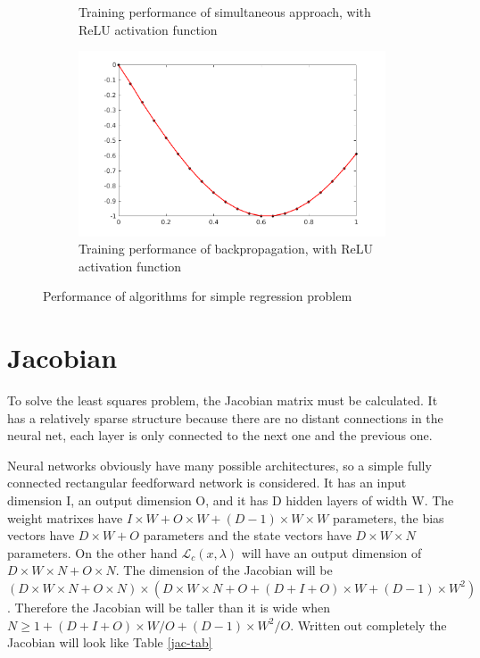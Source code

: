 \begin{figure}
\begin{subfigure}[b]{0.8\textwidth}
         \caption{Training performance of simultaneous approach, with ReLU activation function}
         \label{alm-relu}
     \end{subfigure}
     \begin{subfigure}[b]{0.8\textwidth}
         \centering
         \includegraphics[width=\textwidth]{back-relu}
         \caption{Training performance of backpropagation, with ReLU activation function}
     \end{subfigure}
        \caption{Performance of algorithms for simple regression problem}
        \label{back-relu}
\end{figure}

\section{Jacobian}
To solve the least squares problem, the Jacobian matrix must be calculated. It has a relatively sparse structure because there are no distant connections in the neural net, each layer is only connected to the next one and the previous one.

Neural networks obviously have many possible architectures, so a simple fully connected rectangular feedforward network is considered. It has an input dimension I, an output dimension O, and it has D hidden layers of width W. The weight matrixes have $I\times W + O\times W + (D-1)\times W\times W$ parameters, the bias vectors have $D\times W+O$ parameters and the state vectors have $D\times W\times N$ parameters. On the other hand $\mathcal{L}_c(x,\lambda)$ will have an output dimension of $D\times W \times N + O\times N$. The dimension of the Jacobian will be $(D \times W\times N + O\times N)\times (D\times W\times N + O + (D+I+O)\times W + (D-1)\times W^2)$. Therefore the Jacobian will be taller than it is wide when $N \geq 1 + (D+I+O)\times W/O + (D-1)\times W^2/O$. Written out completely the Jacobian will look like Table \ref{jac-tab}

